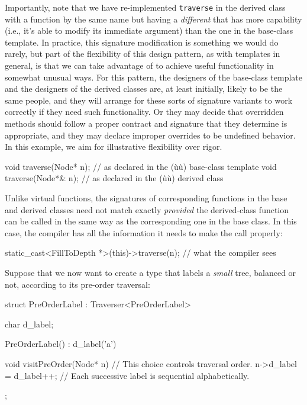 Importantly, note that we have re-implemented \lstinline!traverse! in the
derived class with a function by the same name but having a
\emph{different}  that has more capability (i.e., it's able
to modify its immediate argument) than the one in the base-class
template. In practice, this signature modification is something we would
do rarely, but part of the flexibility of this design pattern, as with
templates in general, is that we can take advantage of  to achieve useful functionality in somewhat unusual ways. For
this pattern, the designers of the base-class template and the designers
of the derived classes are, at least initially, likely to be the same
people, and they will arrange for these sorts of signature variants to
work correctly if they need such functionality. Or they may decide that
overridden methods should follow a proper contract and signature that
they determine is appropriate, and they may declare improper overrides
to be undefined behavior. In this example, we aim for illustrative
flexibility over rigor.

\begin{emcppslisting}[emcppsbatch=e9]
void traverse(Node* n);   // as declared in the (ù{}ù) base-class template
void traverse(Node*& n);  // as declared in the (ù{}ù) derived class
\end{emcppslisting}

\noindent Unlike virtual functions, the signatures of corresponding functions in
the base and derived classes need not match exactly \emph{provided} the
derived-class function can be called in the same way as the
corresponding one in the base class. In this case, the compiler has all
the information it needs to make the call properly:

\begin{emcppslisting}[emcppsignore={illustrative only}]
static_cast<FillToDepth *>(this)->traverse(n);  // what the compiler sees
\end{emcppslisting}

\noindent Suppose that we now want to create a type that labels a \emph{small}
tree, balanced or not, according to its pre-order traversal:

\begin{emcppslisting}[emcppsbatch=e9]
struct PreOrderLabel : Traverser<PreOrderLabel>
{
    char d_label;

    PreOrderLabel() : d_label('a') { }

    void visitPreOrder(Node* n)  // This choice controls traversal order.
    {
        n->d_label = d_label++;
            // Each successive label is sequential alphabetically.
    }
};
\end{emcppslisting}

